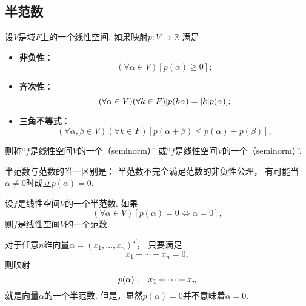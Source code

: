 \subsection{半范数}
\begin{definition}
设\(V\)是域\(F\)上的一个线性空间.
如果映射\(p\colon V \to \mathbb{R}\)
满足\begin{itemize}
	\item {\rm\bf 非负性}：\begin{equation*}
		(\forall \alpha \in V)
		[p(\alpha) \geq 0];
	\end{equation*}

	\item {\rm\bf 齐次性}：\begin{equation*}
		(\forall \alpha \in V)
		(\forall k \in F)
		[
			p(k \alpha) = \abs{k} p(\alpha)
		];
	\end{equation*}

	\item {\rm\bf 三角不等式}：\begin{equation*}
		(\forall \alpha,\beta \in V)
		(\forall k \in F)
		[
			p(\alpha+\beta) \leq p(\alpha) + p(\beta)
		],
	\end{equation*}
\end{itemize}
则称“\(f\)是线性空间\(V\)的一个（seminorm）”
或“\(f\)是线性空间\(V\)的一个（seminorm）”.
\end{definition}

半范数与范数的唯一区别是：
半范数不完全满足范数的非负性公理，
有可能当\(\alpha\neq0\)时成立\(p(\alpha) = 0\).
\begin{proposition}
设\(f\)是线性空间\(V\)的一个半范数.
如果\begin{equation*}
	(\forall \alpha \in V)
	[
		p(\alpha) = 0
		\iff
		\alpha = 0
	],
\end{equation*}
则\(f\)是线性空间\(V\)的一个范数.
\end{proposition}

\begin{example}
对于任意\(n\)维向量\(\alpha = (x_1,\dotsc,x_n)^T\)，
只要满足\begin{equation*}
	x_1 + \dotsb + x_n = 0,
\end{equation*}
则映射\begin{equation*}
	p(\alpha)
	:=
	x_1 + \dotsb + x_n
\end{equation*}
就是向量\(\alpha\)的一个半范数.
但是，显然\(p(\alpha) = 0\)并不意味着\(\alpha = 0\).
\end{example}

